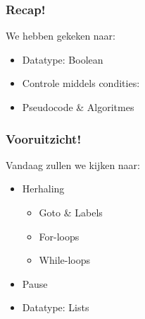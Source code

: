 
\begin{frame}
\frametitle{Recap!}


We hebben gekeken naar:
\begin{itemize}
	\item<2-> Datatype: Boolean
	\item<3-> Controle middels condities: 
	\item<4-> Pseudocode \& Algoritmes
\end{itemize}
\end{frame}

\begin{frame}
\frametitle{Vooruitzicht!}

Vandaag zullen we kijken naar:
\begin{itemize}
	\item<2-> Herhaling
		\begin{itemize}
		  \item<3-> Goto \& Labels
		  \item<4-> For-loops
		  \item<5-> While-loops
		\end{itemize}
	\item<6-> Pause
	\item<7-> Datatype: Lists
\end{itemize}

\end{frame}


